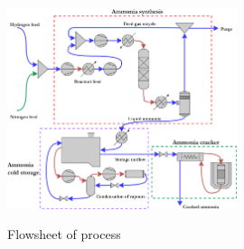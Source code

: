 \documentclass[11pt, a4paper]{article}
\begin{document}
{	\begin{figure}[!htbp]
		\begin{center}

		\label{fig:flowsh}
		\includegraphics[width=0.6\textwidth]{Flowsheet}
		\caption{Flowsheet of process}
		\end{center}
\end{figure}}
\end{document}
